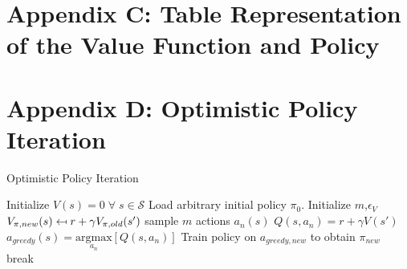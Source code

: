 \chapter{Appendix C: Table Representation of the Value Function and Policy}
\label{appendix_C}

\chapter{Appendix D: Optimistic Policy Iteration}
\label{appendix_D}

\begin{algorithm}
	\caption{Optimistic Policy Iteration}
	\begin{algorithmic}[0] %
		\State
		\State Initialize $V(s) = 0 \; \forall \; s \in \mathcal{S}$
		\State Load arbitrary initial policy $\pi_0$.
		\State Initialize $m$,\;$\epsilon_V$
		\State
		\State $V_{\pi,new}(s) \mathrel{\reflectbox{\ensuremath{\mapsto}}} r+\gamma V_ {\pi,old}(s')$
		\EndFor
		\EndFunction
		\State
		\State sample $m$ actions $a_n(s)$
		\State $Q(s,a_n) = r + \gamma V(s')$
		\EndFor
		\State $a_{greedy}(s)=\underset{a_n}{\text{argmax}}[Q(s,a_n)]$
		\EndFor
		\EndFunction
			\State Train policy on $a_{greedy,new}$ to obtain $\pi_{new}$
		\State
		\State break
		\EndIf	
		\EndWhile
		\State
		\EndFunction
	\end{algorithmic}
	\label{algo:opi}
\end{algorithm}

